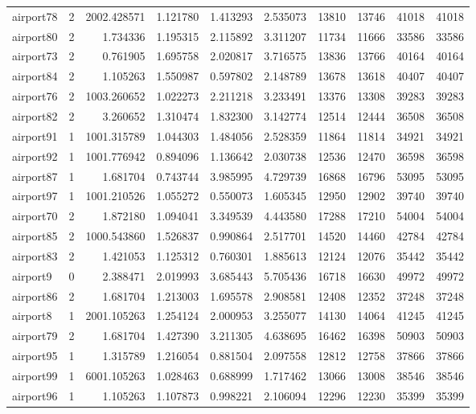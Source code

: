 \begin{longtable}{|l|r|r|r|r|r|r|r|r|r|}
airport78 & 2 & 2002.428571 & 1.121780 & 1.413293 & 2.535073 & 13810 & 13746 & 41018 & 41018 \\
airport80 & 2 & 1.734336 & 1.195315 & 2.115892 & 3.311207 & 11734 & 11666 & 33586 & 33586 \\
airport73 & 2 & 0.761905 & 1.695758 & 2.020817 & 3.716575 & 13836 & 13766 & 40164 & 40164 \\
airport84 & 2 & 1.105263 & 1.550987 & 0.597802 & 2.148789 & 13678 & 13618 & 40407 & 40407 \\
airport76 & 2 & 1003.260652 & 1.022273 & 2.211218 & 3.233491 & 13376 & 13308 & 39283 & 39283 \\
airport82 & 2 & 3.260652 & 1.310474 & 1.832300 & 3.142774 & 12514 & 12444 & 36508 & 36508 \\
airport91 & 1 & 1001.315789 & 1.044303 & 1.484056 & 2.528359 & 11864 & 11814 & 34921 & 34921 \\
airport92 & 1 & 1001.776942 & 0.894096 & 1.136642 & 2.030738 & 12536 & 12470 & 36598 & 36598 \\
airport87 & 1 & 1.681704 & 0.743744 & 3.985995 & 4.729739 & 16868 & 16796 & 53095 & 53095 \\
airport97 & 1 & 1001.210526 & 1.055272 & 0.550073 & 1.605345 & 12950 & 12902 & 39740 & 39740 \\
airport70 & 2 & 1.872180 & 1.094041 & 3.349539 & 4.443580 & 17288 & 17210 & 54004 & 54004 \\
airport85 & 2 & 1000.543860 & 1.526837 & 0.990864 & 2.517701 & 14520 & 14460 & 42784 & 42784 \\
airport83 & 2 & 1.421053 & 1.125312 & 0.760301 & 1.885613 & 12124 & 12076 & 35442 & 35442 \\
airport9 & 0 & 2.388471 & 2.019993 & 3.685443 & 5.705436 & 16718 & 16630 & 49972 & 49972 \\
airport86 & 2 & 1.681704 & 1.213003 & 1.695578 & 2.908581 & 12408 & 12352 & 37248 & 37248 \\
airport8 & 1 & 2001.105263 & 1.254124 & 2.000953 & 3.255077 & 14130 & 14064 & 41245 & 41245 \\
airport79 & 2 & 1.681704 & 1.427390 & 3.211305 & 4.638695 & 16462 & 16398 & 50903 & 50903 \\
airport95 & 1 & 1.315789 & 1.216054 & 0.881504 & 2.097558 & 12812 & 12758 & 37866 & 37866 \\
airport99 & 1 & 6001.105263 & 1.028463 & 0.688999 & 1.717462 & 13066 & 13008 & 38546 & 38546 \\
airport96 & 1 & 1.105263 & 1.107873 & 0.998221 & 2.106094 & 12296 & 12230 & 35399 & 35399 \\

\end{longtable}
